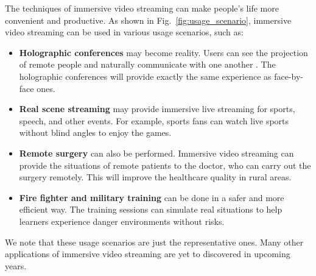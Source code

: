 The techniques of immersive video streaming can make people's life more convenient and productive.
As shown in Fig.~\ref{fig:usage_scenario}, immersive video streaming can be used in various usage scenarios, such as:
\begin{itemize}
    \item {\bf Holographic conferences} may become reality. 
    Users can see the projection of remote people and naturally communicate with one another .
    The holographic conferences will provide exactly the same experience as face-by-face ones.
    \item {\bf Real scene streaming} may provide immersive live streaming for sports, speech, and other events. 
    For example, sports fans can watch live sports without blind angles to enjoy the games.
    \item {\bf Remote surgery} can also be performed. 
    Immersive video streaming can provide the situations of remote patients to 
    the doctor, who can carry out the surgery remotely. This will improve the healthcare quality in rural areas.
    \item {\bf Fire fighter and military training} can be done in a safer and more efficient way. 
    The training sessions can simulate real situations to help learners experience danger environments without risks.
\end{itemize}

We note that these usage scenarios are just the representative ones. Many other applications of immersive video streaming are yet to 
discovered in upcoming years.

